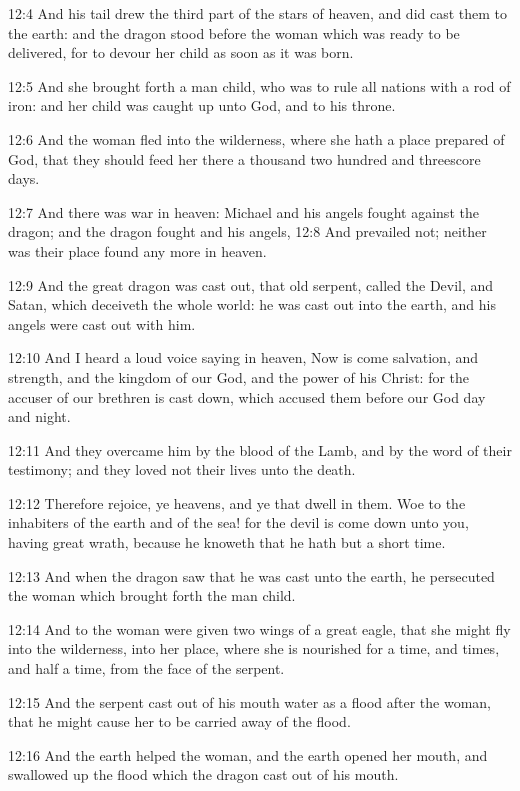 12:4 And his tail drew the third part of the stars of heaven, and did
cast them to the earth: and the dragon stood before the woman which
was ready to be delivered, for to devour her child as soon as it was
born.

12:5 And she brought forth a man child, who was to rule all nations
with a rod of iron: and her child was caught up unto God, and to his
throne.

12:6 And the woman fled into the wilderness, where she hath a place
prepared of God, that they should feed her there a thousand two
hundred and threescore days.

12:7 And there was war in heaven: Michael and his angels fought
against the dragon; and the dragon fought and his angels, 12:8 And
prevailed not; neither was their place found any more in heaven.

12:9 And the great dragon was cast out, that old serpent, called the
Devil, and Satan, which deceiveth the whole world: he was cast out
into the earth, and his angels were cast out with him.

12:10 And I heard a loud voice saying in heaven, Now is come
salvation, and strength, and the kingdom of our God, and the power of
his Christ: for the accuser of our brethren is cast down, which
accused them before our God day and night.

12:11 And they overcame him by the blood of the Lamb, and by the word
of their testimony; and they loved not their lives unto the death.

12:12 Therefore rejoice, ye heavens, and ye that dwell in them. Woe to
the inhabiters of the earth and of the sea! for the devil is come down
unto you, having great wrath, because he knoweth that he hath but a
short time.

12:13 And when the dragon saw that he was cast unto the earth, he
persecuted the woman which brought forth the man child.

12:14 And to the woman were given two wings of a great eagle, that she
might fly into the wilderness, into her place, where she is nourished
for a time, and times, and half a time, from the face of the serpent.

12:15 And the serpent cast out of his mouth water as a flood after the
woman, that he might cause her to be carried away of the flood.

12:16 And the earth helped the woman, and the earth opened her mouth,
and swallowed up the flood which the dragon cast out of his mouth.

